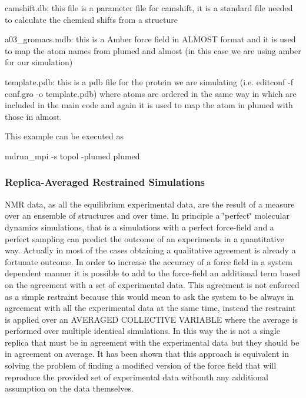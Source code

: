 \begin{DoxyItemize}
\item camshift.\+db\+: this file is a parameter file for camshift, it is a standard file needed to calculate the chemical shifts from a structure
\item a03\+\_\+gromacs.\+mdb\+: this is a Amber force field in A\+L\+M\+O\+S\+T format and it is used to map the atom names from plumed and almost (in this case we are using amber for our simulation)
\item template.\+pdb\+: this is a pdb file for the protein we are simulating (i.\+e. editconf -\/f conf.\+gro -\/o template.\+pdb) where atoms are ordered in the same way in which are included in the main code and again it is used to map the atom in plumed with those in almost.
\end{DoxyItemize}

This example can be executed as

\begin{DoxyVerb}mdrun_mpi -s topol -plumed plumed
\end{DoxyVerb}
\hypertarget{belfast-9_replica}{}\subsubsection{Replica-\/\+Averaged Restrained Simulations}\label{belfast-9_replica}
N\+M\+R data, as all the equilibrium experimental data, are the result of a measure over an ensemble of structures and over time. In principle a \char`\"{}perfect\char`\"{} molecular dynamics simulations, that is a simulations with a perfect force-\/field and a perfect sampling can predict the outcome of an experiments in a quantitative way. Actually in most of the cases obtaining a qualitative agreement is already a fortunate outcome. In order to increase the accuracy of a force field in a system dependent manner it is possible to add to the force-\/field an additional term based on the agreement with a set of experimental data. This agreement is not enforced as a simple restraint because this would mean to ask the system to be always in agreement with all the experimental data at the same time, instead the restraint is applied over an A\+V\+E\+R\+A\+G\+E\+D C\+O\+L\+L\+E\+C\+T\+I\+V\+E V\+A\+R\+I\+A\+B\+L\+E where the average is performed over multiple identical simulations. In this way the is not a single replica that must be in agreement with the experimental data but they should be in agreement on average. It has been shown that this approach is equivalent in solving the problem of finding a modified version of the force field that will reproduce the provided set of experimental data withouth any additional assumption on the data themselves.

